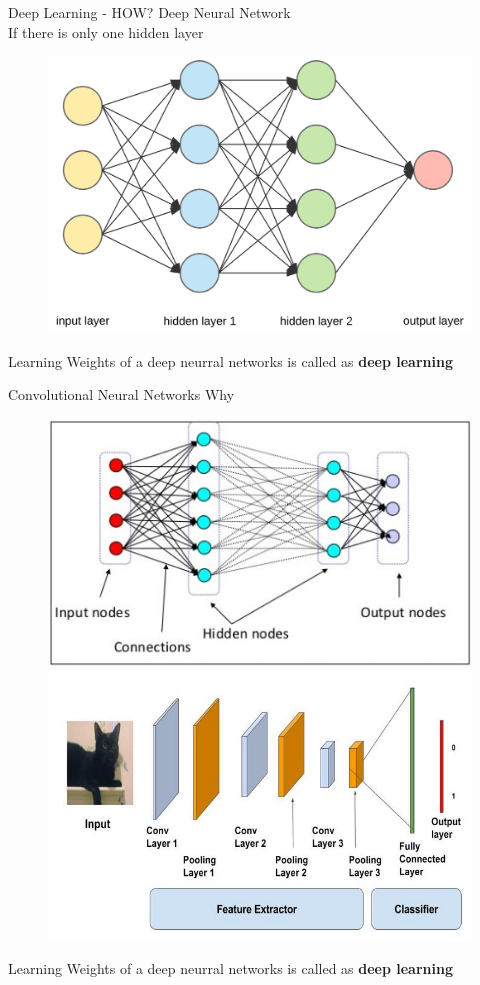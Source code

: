 \documentclass[10pt]{beamer}
\begin{document}
\begin{frame}[fragile]{Deep Learning - HOW?}
    Deep Neural Network \\ 
    If there is only one hidden layer
    \begin{figure}[ht]
      \hspace*{-1cm}\includegraphics[width=0.5\linewidth]{dnn}
    \end{figure}
Learning Weights of a deep neurral networks is called as \textbf{deep learning}
\end{frame}

\begin{frame}[fragile]{Convolutional Neural Networks}
    Why \\ 
    \begin{figure}[ht]
      \hspace*{-1cm}\includegraphics[width=0.5\linewidth]{conv1} \\
      \hspace*{-1cm}\includegraphics[width=0.5\linewidth]{conv2}
    \end{figure}
Learning Weights of a deep neurral networks is called as \textbf{deep learning}
\end{frame}
\end{document}
